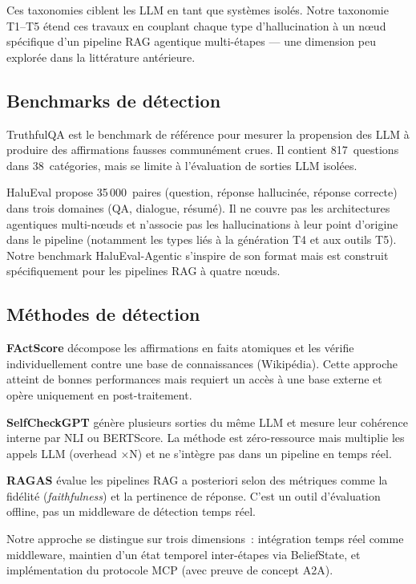\documentclass[12pt,a4paper]{article}
\begin{document}
Ces taxonomies ciblent les LLM en tant que systèmes isolés. Notre taxonomie T1--T5 étend ces travaux en couplant chaque type d'hallucination à un nœud spécifique d'un pipeline RAG agentique multi-étapes --- une dimension peu explorée dans la littérature antérieure.

\subsection{Benchmarks de détection}

TruthfulQA \cite{lin2022truthfulqa} est le benchmark de référence pour mesurer la propension des LLM à produire des affirmations fausses communément crues. Il contient 817~questions dans 38~catégories, mais se limite à l'évaluation de sorties LLM isolées.

HaluEval \cite{li2023halueval} propose 35\,000~paires (question, réponse hallucinée, réponse correcte) dans trois domaines (QA, dialogue, résumé). Il ne couvre pas les architectures agentiques multi-nœuds et n'associe pas les hallucinations à leur point d'origine dans le pipeline (notamment les types liés à la génération T4 et aux outils T5). Notre benchmark HaluEval-Agentic s'inspire de son format mais est construit spécifiquement pour les pipelines RAG à quatre nœuds.

\subsection{Méthodes de détection}

\textbf{FActScore} \cite{min2023factscore} décompose les affirmations en faits atomiques et les vérifie individuellement contre une base de connaissances (Wikipédia). Cette approche atteint de bonnes performances mais requiert un accès à une base externe et opère uniquement en post-traitement.

\textbf{SelfCheckGPT} \cite{manakul2023selfcheckgpt} génère plusieurs sorties du même LLM et mesure leur cohérence interne par NLI ou BERTScore. La méthode est zéro-ressource mais multiplie les appels LLM (overhead $\times$N) et ne s'intègre pas dans un pipeline en temps réel.

\textbf{RAGAS} \cite{es2023ragas} évalue les pipelines RAG a posteriori selon des métriques comme la fidélité (\textit{faithfulness}) et la pertinence de réponse. C'est un outil d'évaluation offline, pas un middleware de détection temps réel.

Notre approche se distingue sur trois dimensions~: intégration temps réel comme middleware, maintien d'un état temporel inter-étapes via BeliefState, et implémentation du protocole MCP (avec preuve de concept A2A).
\end{document}

